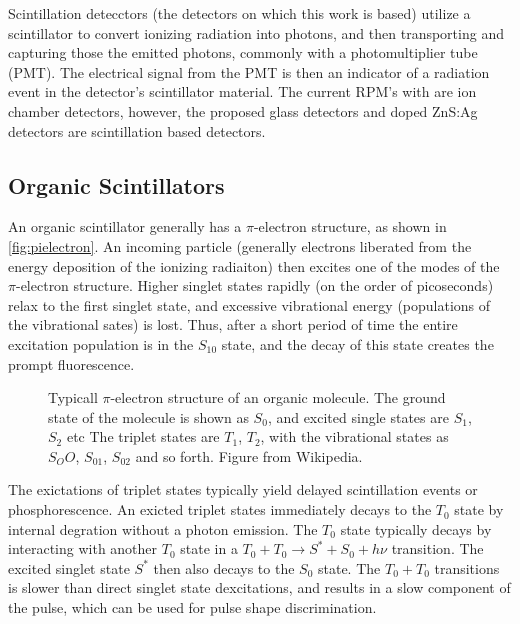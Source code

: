 Scintillation detecctors (the detectors on which this work is based) utilize a scintillator to convert ionizing radiation into photons, and then transporting and capturing those the emitted photons, commonly with a photomultiplier tube (PMT).
The electrical signal from the PMT is then an indicator of a radiation event in the detector's scintillator material.
The current RPM's with  are ion chamber detectors, however, the proposed  glass detectors and  doped ZnS:Ag detectors are scintillation based detectors. 

\subsection{Organic Scintillators}
An organic scintillator generally has a $\pi$-electron structure, as shown in \autoref{fig:pielectron}.
An incoming particle (generally electrons liberated from the energy deposition of the ionizing radiaiton) then excites one of the modes of the $\pi$-electron structure.
Higher singlet states rapidly (on the order of picoseconds) relax to the first singlet state, and excessive vibrational energy (populations of the vibrational sates) is lost.
Thus, after a short period of time the entire excitation population is in the $S_10$ state, and the decay of this state creates the prompt fluorescence.
\begin{figure}
  \centering
  \caption[$\pi$ Electron Structure]{Typicall $\pi$-electron structure of an organic molecule. The ground state of the molecule is shown as $S_0$, and excited single states are $S_1$, $S_2$ etc The triplet states are $T_1$, $T_2$, with the vibrational states as $S_OO$, $S_01$, $S_02$ and so forth. Figure from Wikipedia.}
  \label{fig:pielectron}
\end{figure}
The exictations of triplet states typically yield delayed scintillation events or phosphorescence.
An exicted triplet states immediately decays to the $T_0$ state by internal degration without a photon emission.
The $T_0$ state typically decays by interacting with another $T_0$ state in a $T_0 + T_0 \to S^* + S_0 + h\nu$ transition.
The excited singlet state $S^*$ then also decays to the $S_0$ state.
The $T_0 + T_0$ transitions is slower than direct singlet state dexcitations, and results in a slow component of the pulse, which can be used for pulse shape discrimination.

